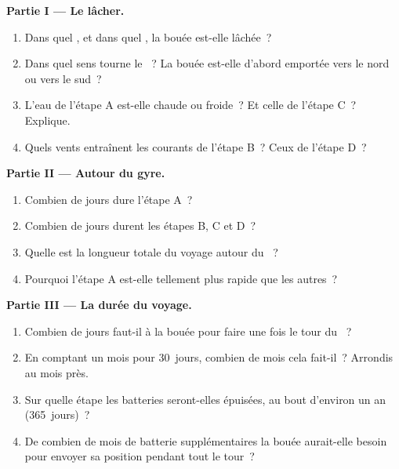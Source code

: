 \begin{problem}
\noindent\textbf{Partie I --- Le lâcher.}\par\nopagebreak
\begin{enumerate}[beginpenalty=10000]
  \item Dans quel , et dans quel , la bouée est-elle
        lâchée~?
  \item Dans quel sens tourne le ~? La bouée est-elle d'abord emportée
        vers le nord ou vers le sud~?
  \item L'eau de l'étape A est-elle chaude ou froide~? Et celle de
        l'étape C~? Explique.
  \item Quels vents entraînent les courants de l'étape B~? Ceux de
        l'étape D~?
\end{enumerate}

\noindent\textbf{Partie II --- Autour du gyre.}\par\nopagebreak
\begin{enumerate}[resume, beginpenalty=10000]
  \item Combien de jours dure l'étape A~?
  \item Combien de jours durent les étapes B, C et D~?
  \item Quelle est la longueur totale du voyage autour du ~?
  \item Pourquoi l'étape A est-elle tellement plus rapide que les autres~?
\end{enumerate}

\noindent\textbf{Partie III --- La durée du voyage.}\par\nopagebreak
\begin{enumerate}[resume, beginpenalty=10000]
  \item Combien de jours faut-il à la bouée pour faire une fois le tour du
        ~?
  \item En comptant un mois pour 30~jours, combien de mois cela fait-il~?
        Arrondis au mois près.
  \item Sur quelle étape les batteries seront-elles épuisées, au bout
        d'environ un an (365~jours)~?
  \item De combien de mois de batterie supplémentaires la bouée aurait-elle
        besoin pour envoyer sa position pendant tout le tour~?
\end{enumerate}
\end{problem}
